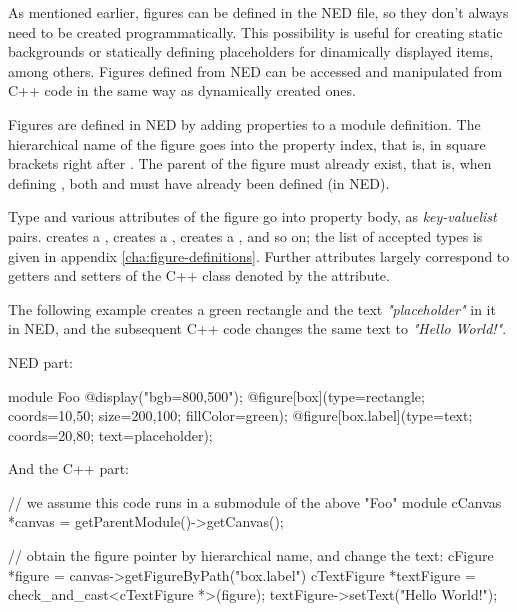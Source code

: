 As mentioned earlier, figures can be defined in the NED file, so they
don't always need to be created programmatically. This possibility is
useful for creating static backgrounds or statically defining placeholders
for dinamically displayed items, among others. Figures defined from NED can
be accessed and manipulated from C++ code in the same way as dynamically
created ones.

Figures are defined in NED by adding  properties to a module definition.
The hierarchical name of the figure goes into the property index, that is, in
square brackets right after . The parent of the figure must
already exist, that is, when defining , both  and
 must have already been defined (in NED).

Type and various attributes of the figure go into property body, as
\textit{key-valuelist} pairs.  creates a
,  creates a
,  creates a ,
and so on; the list of accepted types is given in appendix
\ref{cha:figure-definitions}. Further attributes largely correspond to
getters and setters of the C++ class denoted by the  attribute.

The following example creates a green rectangle and the text
\textit{"placeholder"} in it in NED, and the subsequent C++ code changes
the same text to \textit{"Hello World!"}.

NED part:

\begin{ned}
module Foo
{
    @display("bgb=800,500");
    @figure[box](type=rectangle; coords=10,50; size=200,100; fillColor=green);
    @figure[box.label](type=text; coords=20,80; text=placeholder);
}
\end{ned}

And the C++ part:

\begin{cpp}
// we assume this code runs in a submodule of the above "Foo" module
cCanvas *canvas = getParentModule()->getCanvas();

// obtain the figure pointer by hierarchical name, and change the text:
cFigure *figure = canvas->getFigureByPath("box.label")
cTextFigure *textFigure = check_and_cast<cTextFigure *>(figure);
textFigure->setText("Hello World!");
\end{cpp}


